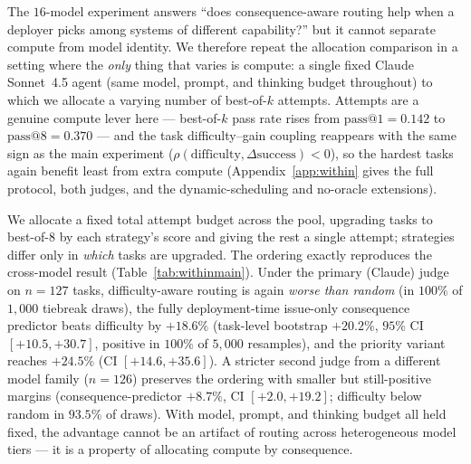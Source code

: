 \documentclass{article}
\begin{document}
The $16$-model experiment answers ``does consequence-aware routing help
when a deployer picks among systems of different capability?'' but it
cannot separate compute from model identity. We therefore repeat the
allocation comparison in a setting where the \emph{only} thing that
varies is compute: a single fixed Claude Sonnet~4.5 agent (same model,
prompt, and thinking budget throughout) to which we allocate a varying
number of best-of-$k$ attempts. Attempts are a genuine compute lever
here --- best-of-$k$ pass rate rises from
$\mathrm{pass@}1 = 0.142$ to $\mathrm{pass@}8 = 0.370$ --- and the
task difficulty--gain coupling reappears with the same sign as the main
experiment ($\rho(\mathrm{difficulty}, \Delta\mathrm{success}) < 0$),
so the hardest tasks again benefit least from extra compute
(Appendix~\ref{app:within} gives the full protocol, both judges, and
the dynamic-scheduling and no-oracle extensions).

We allocate a fixed total attempt budget across the pool, upgrading
tasks to best-of-$8$ by each strategy's score and giving the rest a
single attempt; strategies differ only in \emph{which} tasks are
upgraded. The ordering exactly reproduces the cross-model result
(Table~\ref{tab:withinmain}). Under the primary (Claude) judge on
$n{=}127$ tasks, difficulty-aware routing is again \emph{worse than
random} (in $100\%$ of $1{,}000$ tiebreak draws), the fully
deployment-time issue-only consequence predictor beats difficulty by
$+18.6\%$ (task-level bootstrap $+20.2\%$, $95\%$ CI $[+10.5, +30.7]$,
positive in $100\%$ of $5{,}000$ resamples), and the priority variant
reaches $+24.5\%$ (CI $[+14.6, +35.6]$). A stricter second judge from
a different model family ($n{=}126$) preserves the ordering with
smaller but still-positive margins (consequence-predictor $+8.7\%$, CI
$[+2.0, +19.2]$; difficulty below random in $93.5\%$ of draws). With
model, prompt, and thinking budget all held fixed, the advantage
cannot be an artifact of routing across heterogeneous model tiers ---
it is a property of allocating compute by consequence.
\end{document}
